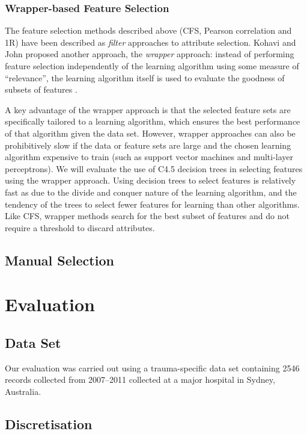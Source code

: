 \documentclass{article}
\begin{document}
\subsubsection{Wrapper-based Feature Selection}
The feature selection methods described above (CFS, Pearson correlation and
1R) have been described as \textit{filter} approaches to attribute selection.
Kohavi and John proposed another approach, the \textit{wrapper} approach:
instead of performing feature selection independently of the learning
algorithm using some measure of ``relevance'',
the learning algorithm itself is used to evaluate the goodness of
subsets of features \cite{Kohavi1997}. 

A key advantage of the wrapper approach is that the selected feature sets are
specifically tailored to a learning algorithm, which ensures the best
performance of that algorithm given the data set. However, wrapper approaches
can also be prohibitively slow if the data or feature sets are large and the
chosen learning algorithm expensive to train (such as support vector machines
and multi-layer perceptrons). We will evaluate the use of C4.5 decision trees
in selecting features using the wrapper approach.
Using decision trees to select features is relatively fast as due to the
divide and conquer nature of the learning algorithm, and the tendency of the
trees to select fewer features for learning than other algorithms. Like CFS,
wrapper methods search for the best subset of features and do not require a
threshold to discard attributes.

\subsection{Manual Selection}

\section{Evaluation}
\label{sec:eval}
\subsection{Data Set}
Our evaluation was carried out using a trauma-specific data set
containing 2546 records collected from 2007--2011 collected at a major hospital
in Sydney, Australia.

\subsection{Discretisation}
\end{document}
